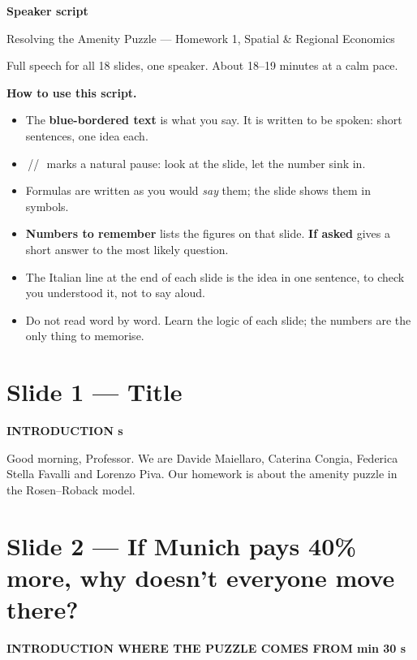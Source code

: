 \documentclass[11pt,a4paper]{article}
\newcommand{\slide}[3]{\Needspace{14\baselineskip}\section{#1}\textcolor{unicared}{\small\bfseries\MakeUppercase{#3}\quad\textperiodcentered\quad #2}\par}
\newcommand{\pause}{\textcolor{unicared}{\,/\!/\,}}
\begin{document}
{\color{unicablue}\Huge\bfseries Speaker script\par}
\vspace{2pt}
{\Large Resolving the Amenity Puzzle --- Homework 1, Spatial \& Regional Economics\par}
\vspace{6pt}
{\small Full speech for all 18 slides, one speaker. About 18--19 minutes at a calm pace.}

\begin{tcolorbox}[colback=tint,colframe=tint,arc=0pt]
\small
\textbf{How to use this script.}
\begin{itemize}[leftmargin=14pt,itemsep=1pt,topsep=2pt]
  \item The \textbf{blue-bordered text} is what you say. It is written to be spoken: short sentences, one idea each.
  \item \pause\ marks a natural pause: look at the slide, let the number sink in.
  \item Formulas are written as you would \emph{say} them; the slide shows them in symbols.
  \item \textbf{Numbers to remember} lists the figures on that slide. \textbf{If asked} gives a short answer to the most likely question.
  \item The Italian line at the end of each slide is the idea in one sentence, to check you understood it, not to say aloud.
  \item Do not read word by word. Learn the logic of each slide; the numbers are the only thing to memorise.
\end{itemize}
\end{tcolorbox}

\slide{Slide 1 --- Title}{20 s}{Introduction}

\begin{say}
Good morning, Professor. We are Davide Maiellaro, Caterina Congia, Federica Stella Favalli and Lorenzo Piva. Our homework is about the amenity puzzle in the Rosen--Roback model.
\end{say}

\slide{Slide 2 --- If Munich pays 40\% more, why doesn't everyone move there?}{1 min 30 s}{Introduction \textperiodcentered{} where the puzzle comes from}
\end{document}
